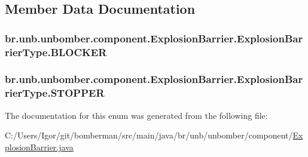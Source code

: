 \subsection{Member Data Documentation}
\hypertarget{enumbr_1_1unb_1_1unbomber_1_1component_1_1_explosion_barrier_1_1_explosion_barrier_type_adb66bff5cf3328d1e6ed12c8a1a27d3b}{
\subsubsection[{B\+L\+O\+C\+K\+E\+R}]{\setlength{\rightskip}{0pt plus 5cm}br.\+unb.\+unbomber.\+component.\+Explosion\+Barrier.\+Explosion\+Barrier\+Type.\+B\+L\+O\+C\+K\+E\+R}}\label{enumbr_1_1unb_1_1unbomber_1_1component_1_1_explosion_barrier_1_1_explosion_barrier_type_adb66bff5cf3328d1e6ed12c8a1a27d3b}
\hypertarget{enumbr_1_1unb_1_1unbomber_1_1component_1_1_explosion_barrier_1_1_explosion_barrier_type_a40f15f4d270a8ca650a48e8e44faa16a}{
\subsubsection[{S\+T\+O\+P\+P\+E\+R}]{\setlength{\rightskip}{0pt plus 5cm}br.\+unb.\+unbomber.\+component.\+Explosion\+Barrier.\+Explosion\+Barrier\+Type.\+S\+T\+O\+P\+P\+E\+R}}\label{enumbr_1_1unb_1_1unbomber_1_1component_1_1_explosion_barrier_1_1_explosion_barrier_type_a40f15f4d270a8ca650a48e8e44faa16a}


The documentation for this enum was generated from the following file\+:\begin{DoxyCompactItemize}
\item 
C\+:/\+Users/\+Igor/git/bomberman/src/main/java/br/unb/unbomber/component/\hyperlink{_explosion_barrier_8java}{Explosion\+Barrier.\+java}\end{DoxyCompactItemize}
